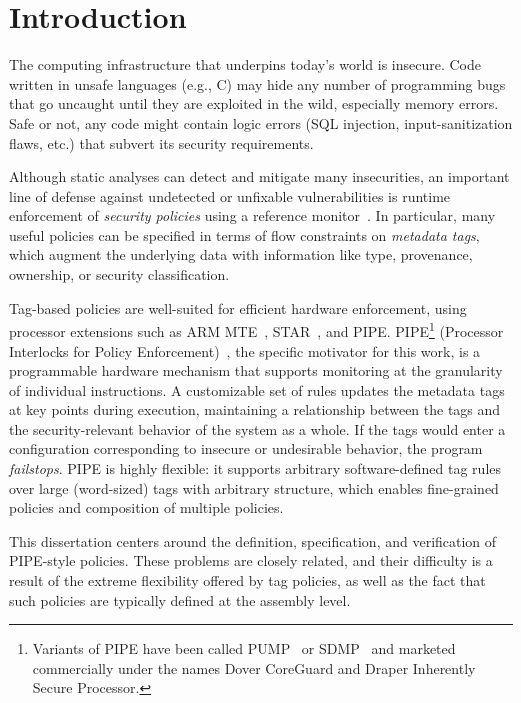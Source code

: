 \documentclass{report}
\begin{document}
\chapter{Introduction}

The computing infrastructure that underpins today's world is insecure. Code written
in unsafe languages (e.g., C) may hide any number of programming bugs that go uncaught
until they are exploited in the wild, especially memory errors. Safe or not, any code
might contain logic errors (SQL injection, input-sanitization flaws, etc.) that subvert
its security requirements.

Although static analyses can detect and mitigate many insecurities, an important line of
defense against undetected or unfixable vulnerabilities is runtime enforcement of
{\em security policies} using a reference monitor~\cite{Anderson72:PlanningStudy}. In particular, 
many useful policies can be specified in terms of flow constraints on 
\emph{metadata tags}, which augment the underlying data with information like type, provenance,
ownership, or security classification.

Tag-based policies are well-suited for efficient hardware enforcement, using 
processor extensions such as ARM MTE~\cite{arm-mte},
STAR~\cite{Gollapudi:23}, and
PIPE.  PIPE\footnote{ Variants of PIPE have
been called PUMP~\cite{Dhawan+15} or %
SDMP~\cite{RoesslerD18}%
and marketed commercially under the names Dover CoreGuard and Draper Inherently Secure Processor.}
(Processor Interlocks for Policy Enforcement)~\cite{Azevedo+16,Azevedo+15},%
the specific motivator for this work, is a programmable hardware mechanism that supports monitoring 
at the granularity of individual instructions. A customizable set of rules updates the metadata tags
at key points during execution, maintaining a relationship between the tags and the security-relevant
behavior of the system as a whole. If the tags would enter a configuration corresponding to insecure
or undesirable behavior, the program \emph{failstops}. PIPE is highly flexible: it supports
arbitrary software-defined tag rules over large (word-sized) tags with arbitrary structure,
which enables fine-grained policies and composition of multiple policies.

This dissertation centers around the definition, specification, and verification of
PIPE-style policies. These problems are closely related, and their difficulty is a result 
of the extreme flexibility offered by tag policies, as well as the fact that such policies
are typically defined at the assembly level.
\end{document}
